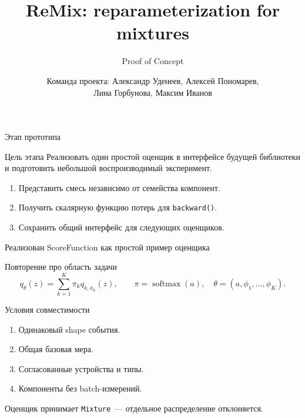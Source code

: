 \documentclass[aspectratio=169]{beamer}
\title{ReMix: reparameterization for mixtures}
\subtitle{Proof of Concept}
\author{Команда проекта: Александр Уденеев, Алексей Пономарев,\\Лина Горбунова, Максим Иванов}
\institute{ИАД, МФТИ}
\date{\empty}
\begin{document}
\begin{frame}
  \thispagestyle{empty}
  \maketitle
\end{frame}

\begin{frame}{Этап прототипа}
  \begin{block}{Цель этапа}
    Реализовать один простой оценщик в интерфейсе будущей библиотеки
    и подготовить небольшой воспроизводимый эксперимент.
  \end{block}
  \begin{enumerate}
    \item Представить смесь независимо от семейства компонент.
    \item Получить скалярную функцию потерь для \texttt{backward()}.
    \item Сохранить общий интерфейс для следующих оценщиков.
  \end{enumerate}
  \medskip
  Реализован ScoreFunction как простой пример оценщика
\end{frame}

\begin{frame}{Повторение про область задачи}
  \[
    q_\theta(z)=\sum_{k=1}^{K}\pi_k q_{k,\phi_k}(z),
    \qquad \pi=\operatorname{softmax}(a),\quad
    \theta=(a,\phi_1,\ldots,\phi_K).
  \]
  
  \begin{block}{Условия совместимости}
    \begin{enumerate}
        \item Одинаковый shape события.
        \item Общая базовая мера.
        \item Согласованные устройства и типы.
        \item Компоненты без batch-измерений.
    \end{enumerate}
  \end{block}

  \medskip
  Оценщик принимает \texttt{Mixture}~--- отдельное распределение отклоняется.
\end{frame}
\end{document}
